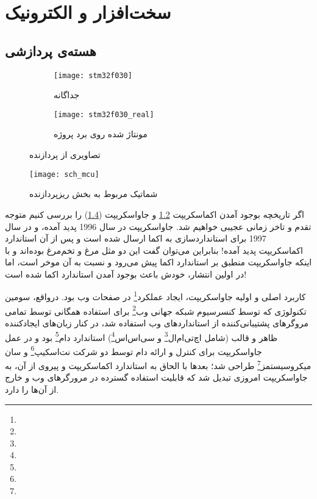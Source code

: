 \chapter{سخت‌افزار و الکترونیک}



\section{هسته‌ی پردازشی}

\begin{figure}[h]
	\centering
	\begin{subfigure}{0.45\textwidth}
		\centering
		\texttt{[image: stm32f030]}
		\caption{جداگانه}
		\label{fig:stm32_image}
	\end{subfigure}
	\begin{subfigure}{0.45\textwidth}
		\centering
		\texttt{[image: stm32f030\_real]}
		\caption{مونتاژ شده روی برد پروژه}
		\label{fig:stm32_real}
	\end{subfigure}
	\caption{تصاویری از پردازنده }
	\label{fig:stm32}
\end{figure}

\begin{figure}
	\centering
	\texttt{[image: sch\_mcu]}
	\caption{شماتیک مربوط به بخش ریزپردازنده}
	\label{fig:ecma1}
\end{figure}


اگر تاریخچه بوجود آمدن اکماسکریپت \ref{fig:stm32_real} و جاواسکریپت (\cref{fig:ecma1}) را بررسی کنیم متوجه تقدم و تاخر زمانی عجیبی خواهیم شد. جاواسکریپت در سال 1996 پدید آمده، و در سال 1997 برای استانداردسازی به اکما ارسال شده است و پس از آن استاندارد اکماسکریپت پدید آمده! بنابراین می‌توان گفت این دو مثل مرغ و تخم‌مرغ بوده‌اند و با اینکه جاواسکریپت منطبق بر استاندارد اکما پیش می‌رود و نسبت به آن موخر است، اما در اولین انتشار، خودش باعث بوجود آمدن استاندارد اکما شده است!

کاربرد اصلی و اولیه جاواسکریپت، ایجاد عملکرد\footnote{} در صفحات وب بود. درواقع، سومین تکنولوژی که توسط کنسرسیوم شبکه جهانی وب\footnote{} برای استفاده همگانی توسط تمامی مروگرهای پشتیبانی‌کننده از استانداردهای وب استفاده شد، در کنار زبان‌های ایجادکننده ظاهر و قالب (شامل اچ‌تی‌ام‌ال\footnote{} و سی‌اس‌اس\footnote{}) استاندارد دام\footnote{} بود و در عمل جاواسکریپت برای کنترل و ارائه دام توسط دو شرکت نت‌اسکیپ\footnote{} و سان میکروسیستمز\footnote{} طراحی شد؛ بعدها با الحاق به استاندارد اکماسکریپت و پیروی از آن، به جاواسکریپت امروزی تبدیل شد که قابلیت استفاده گسترده در مرورگرهای وب و خارج از آن‌ها را دارد\cite{ecma}.


